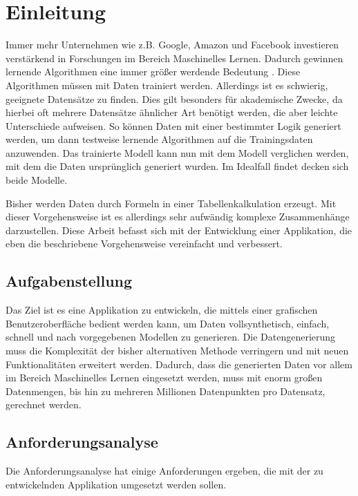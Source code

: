 
\chapter{Einleitung}

Immer mehr Unternehmen wie z.B. Google, Amazon und Facebook investieren verstärkend in Forschungen im Bereich Maschinelles Lernen. Dadurch gewinnen lernende Algorithmen eine immer größer werdende Bedeutung \cite{mengesonnentag:2018}. Diese Algorithmen müssen mit Daten trainiert werden. Allerdings ist es schwierig, geeignete Datensätze zu finden. Dies gilt besonders für akademische Zwecke, da hierbei oft mehrere Datensätze ähnlicher Art benötigt werden, die aber leichte Unterschiede aufweisen. So können Daten mit einer bestimmter Logik generiert werden, um dann testweise lernende Algorithmen auf die Trainingsdaten anzuwenden. Das trainierte Modell kann nun mit dem Modell verglichen werden, mit dem die Daten ursprünglich generiert wurden. Im Idealfall findet decken sich beide Modelle.

Bisher werden Daten durch Formeln in einer Tabellenkalkulation erzeugt. Mit dieser Vorgehensweise ist es allerdings sehr aufwändig komplexe Zusammenhänge darzustellen. Diese Arbeit befasst sich mit der Entwicklung einer Applikation, die eben die beschriebene Vorgehensweise vereinfacht und verbessert.

\section{Aufgabenstellung}

Das Ziel ist es eine Applikation zu entwickeln, die mittels einer grafischen Benutzeroberfläche bedient werden kann, um Daten vollsynthetisch, einfach, schnell und nach vorgegebenen Modellen zu generieren. Die Datengenerierung muss die Komplexität der bisher alternativen Methode verringern und mit neuen Funktionalitäten erweitert werden. Dadurch, dass die generierten Daten vor allem im Bereich Maschinelles Lernen eingesetzt werden, muss mit enorm großen Datenmengen, bis hin zu mehreren Millionen Datenpunkten pro Datensatz, gerechnet werden.

\section{Anforderungsanalyse}
\label{sec:anforderungsanalyse}

Die Anforderungsanalyse hat einige Anforderungen ergeben, die mit der zu entwickelnden Applikation umgesetzt werden sollen.

